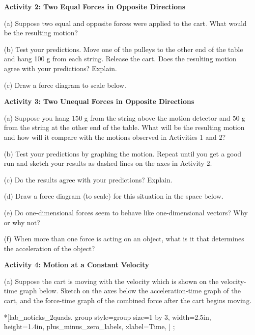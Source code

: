 \pagebreak[3]
\textbf{Activity 2: Two Equal Forces in Opposite Directions}

(a) Suppose two equal and opposite forces were applied to the cart. What would
be the resulting motion?
\answerspace{10mm}

\pagebreak[2]
(b) Test your predictions. Move one of the pulleys to the other end of the table
and hang 100 g from each string. Release the cart. Does the resulting motion
agree with your predictions? Explain.
\answerspace{20mm}

(c) Draw a force diagram to scale below.
\answerspace{20mm}

\textbf{Activity 3: Two Unequal Forces in Opposite Directions}

(a) Suppose you hang 150 g from the string above the motion detector and 50
g from the string at the other end of the table. What will be the resulting
motion and how will it compare with the motions observed in Activities 1 and
2?
\answerspace{20mm}

(b) Test your predictions by graphing the motion. Repeat until you get a good
run and sketch your results as dashed lines on the axes in Activity 2.

(c) Do the results agree with your predictions? Explain.
\answerspace{20mm}

(d) Draw a force diagram (to scale) for this situation in the space below.
\vspace{10mm}

(e) Do one-dimensional forces seem to behave like one-dimensional vectors? Why
or why not?
\answerspace{20mm}

(f) When more than one force is acting on an object, what is it that determines
the acceleration of the object?
\answerspace{20mm}

\pagebreak[2]
\textbf{Activity 4: Motion at a Constant Velocity}

(a) Suppose the cart is moving with the velocity which is shown on the velocity-time
graph below. Sketch on the axes below the acceleration-time graph of the cart,
and the force-time graph of the combined force after the cart begins moving.

\begin{lab_groupplot}*{}[lab_noticks_2quads,
	group style={group size=1 by 3},
	width=2.5in,  height=1.4in,
	plus_minus_zero_labels,
	xlabel=Time,
	]
\nextgroupplot[ylabel=Velocity,]
	;
\nextgroupplot[ylabel=Acceleration,]
\nextgroupplot[ylabel=Force,]
\end{lab_groupplot}

